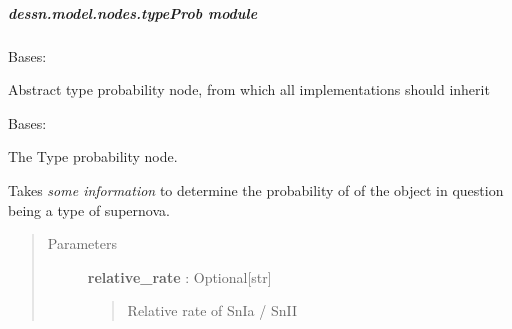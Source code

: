\documentclass[letterpaper,10pt,english]{sphinxmanual}
\begin{document}
\subparagraph{dessn.model.nodes.typeProb module}
\label{dessn.model.nodes:dessn-model-nodes-typeprob-module}\label{dessn.model.nodes:module-dessn.model.nodes.typeProb}

\begin{fulllineitems}
\label{dessn.model.nodes:dessn.model.nodes.typeProb.TypeProbability}
Bases: {\hyperref[dessn.model:dessn.model.node.Node]{\emph{}}}

Abstract type probability node, from which all implementations should inherit

\begin{fulllineitems}
\label{dessn.model.nodes:dessn.model.nodes.typeProb.TypeProbability.get_name}
\end{fulllineitems}


\end{fulllineitems}


\begin{fulllineitems}
\label{dessn.model.nodes:dessn.model.nodes.typeProb.TypeProbabilitySimple}
Bases: {\hyperref[dessn.model.nodes:dessn.model.nodes.typeProb.TypeProbability]{\emph{}}}

The Type probability node.

Takes \emph{some information} to determine the probability of
of the object in question being a type of supernova.
\begin{quote}\begin{description}
\item[{Parameters}] \leavevmode
\textbf{relative\_rate} : Optional{[}str{]}
\begin{quote}

Relative rate of SnIa / SnII
\end{quote}

\end{description}\end{quote}

\end{fulllineitems}
\end{document}
